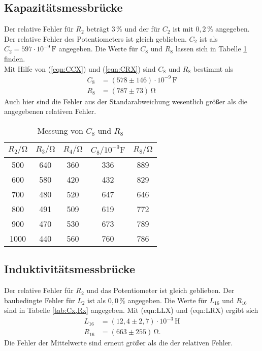 \subsection{Kapazitätsmessbrücke}
Der relative Fehler für $R_2$ beträgt $3\,\%$ und der für $C_2$ ist mit $0,2 \,\%$ angegeben. Der relative Fehler des Potentiometers ist gleich geblieben.
$C_2$ ist als $C_2 = 597 \cdot 10^{-9}\,\unit{\farad}$ angegeben. Die Werte für $C_8$ und $R_8$ lassen sich in Tabelle \ref{tab:C8,R8} finden.\\
Mit Hilfe von (\ref{eqn:CCX}) und (\ref{eqn:CRX}) sind $C_8$ und $R_8$ bestimmt als
\begin{align*}
  C_8 &= (578 \pm 146)\cdot 10^{-9} \,\unit{\farad} \\
  R_8 &= (787 \pm 73)\,\unit{\ohm}
\end{align*}
Auch hier sind die Fehler aus der Standarabweichung wesentlich größer als die angegebenen relativen Fehler.

\begin{table}
  \centering
  \caption{Messung von $C_8$ und $R_8$}
  \label{tab:C8,R8}
  \begin{tabular}{c c c c c}
    \toprule
    $R_2/\unit{\ohm}$ & $R_3/\unit{\ohm}$ & $R_4/\unit{\ohm}$ & $C_8/10^{-9}\unit{\farad}$ & $R_8/\unit{\ohm}$ \\
    \midrule
     500 & 640 & 360 & 336 & 889 \\
     600 & 580 & 420 & 432 & 829 \\
     700 & 480 & 520 & 647 & 646 \\
     800 & 491 & 509 & 619 & 772 \\
     900 & 470 & 530 & 673 & 789 \\
    1000 & 440 & 560 & 760 & 786 \\
    \bottomrule
  \end{tabular}
\end{table}

\subsection{Induktivitätsmessbrücke}
Der relative Fehler für $R_2$ und das Potentiometer ist gleich geblieben. Der baubedingte Fehler für $L_2$ ist als $0,0\,\%$ angegeben.
Die Werte für $L_{16}$ und $R_{16}$ sind in Tabelle \ref{tab:Cx,Rx} angegeben. Mit (eqn:LLX) und (eqn:LRX) ergibt sich
\begin{align*}
  L_{16} &= (12,4 \pm 2,7)\cdot 10^{-3} \,\unit{\henry} \\
  R_{16} &= (663 \pm 255)\,\unit{\ohm}.
\end{align*}
Die Fehler der Mittelwerte sind erneut größer als die der relativen Fehler.

